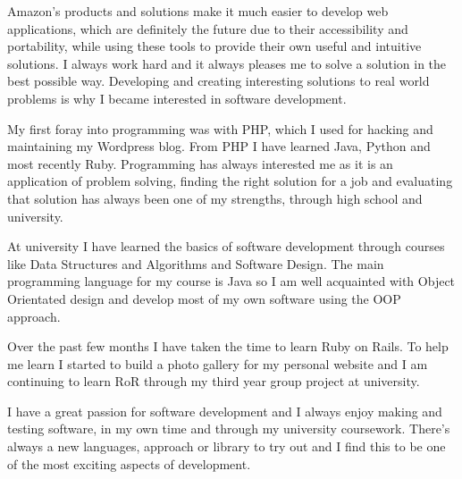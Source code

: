 


\setlength{\parskip}{0.5em}




Amazon's products and solutions make it much easier to develop web applications,
which are definitely the future due to their accessibility and portability,
while using these tools to provide their own useful and intuitive solutions. 
I always work hard and it always pleases me to solve a solution in the best
possible way.  Developing and creating interesting solutions to real world
problems is why I became interested in software development.


My first foray into programming was with PHP, which I used for hacking and
maintaining my Wordpress blog. From PHP I have learned Java, Python and most
recently Ruby. Programming has always interested me as it is an application of
problem solving, finding the right solution for a job and evaluating that
solution has always been one of my strengths, through high school and
university.

At university I have learned the basics of software development through courses
like Data Structures and Algorithms and Software Design. The main programming
language for my course is Java so I am well acquainted with Object Orientated
design and develop most of my own software using the OOP approach.

Over the past few months I have taken the time to learn Ruby on Rails. To help
me learn I started to build a photo gallery for my personal website and I am
continuing to learn RoR through my third year group project at university.


I have a great passion for software development and I always enjoy making and
testing software, in my own time and through my university coursework. There's
always a new languages, approach or library to try out and I find this to be one
of the most exciting aspects of development.

